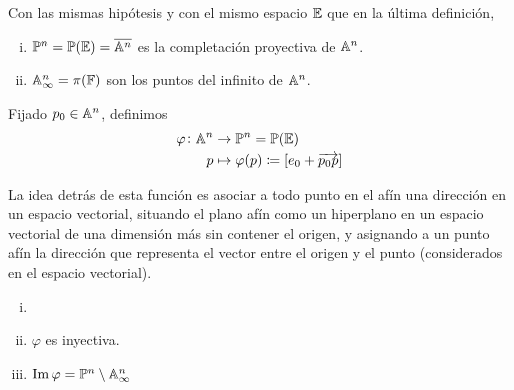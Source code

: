 \begin{defi}
  Con las mismas hipótesis y con el mismo espacio $\mathbb{E}$ que en la última definición,
  \begin{enumerate}[i)]
    \item $\mathbb{P}^n = \mathbb{P} (\mathbb{E}) = \overline{\mathbb{A}^n}$ es la completación proyectiva
    de $\mathbb{A}^n$.
    \item $\mathbb{A}^n_\infty = \pi(\mathbb{F})$ son los puntos del infinito de $\mathbb{A}^n$.
  \end{enumerate}
\end{defi}

\begin{defi}
  Fijado $p_0 \in \mathbb{A}^n$, definimos
   \[
     \begin{aligned}
       \varphi \colon \mathbb{A}^n &\to \mathbb{P}^n = \mathbb{P}(\mathbb{E})\\
       p &\mapsto \varphi(p) \coloneqq [e_0 + \overrightarrow{p_0p}]
     \end{aligned}
   \]
\end{defi}

\begin{obs}
  La idea detrás de esta función es asociar a todo punto en el afín una dirección
  en un espacio vectorial, situando el plano afín como un hiperplano 
  en un espacio vectorial de una dimensión más sin contener el origen, 
  y asignando a un punto afín la dirección que representa el vector entre el origen
  y el punto (considerados en el espacio vectorial).
\end{obs}

\begin{prop}
  \begin{enumerate}[i)]
    \item[]
    \item $\varphi$ es inyectiva.
    \item $\operatorname{Im} \varphi = \mathbb{P}^n \setminus \mathbb{A}^n_\infty$
  \end{enumerate}
\end{prop}

